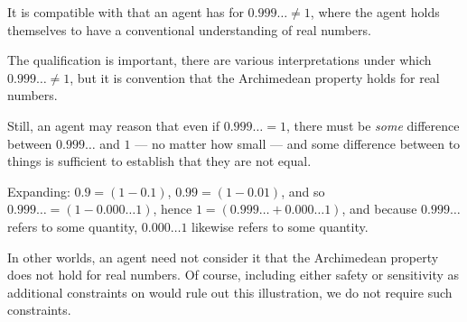 \begin{note}
  \begin{illustration}
    It is compatible with \ideaS{} that an agent has \support{} for \(0.999\dots \ne 1\), where the agent holds themselves to have a conventional understanding of real numbers.
  \end{illustration}
  The qualification is important, there are various interpretations under which \(0.999\dots \ne 1\), but it is convention that the Archimedean property holds for real numbers.

  Still, an agent may reason that even if \(0.999\dots = 1\), there must be \emph{some} difference between \(0.999\dots\) and \(1\) --- no matter how small --- and some difference between to things is sufficient to establish that they are not equal.

  Expanding: \(0.9 = (1 - 0.1)\), \(0.99 = (1 - 0.01)\), and so \(0.999\dots = (1 - 0.000\dots 1)\), hence \(1 = (0.999\dots + 0.000\dots 1)\), and because \(0.999\dots\) refers to some quantity, \(0.000\dots 1\) likewise refers to some quantity.

  In other worlds, an agent need not consider it \epPAd{} that the Archimedean property does not hold for real numbers.
  Of course, including either safety or sensitivity as additional constraints on \support{} would rule out this illustration, we do not require such constraints.
\end{note}

